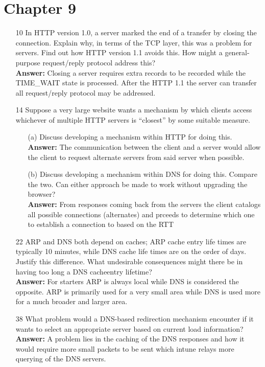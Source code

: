 \documentclass[a4paper]{article}
\begin{document}
\section*{Chapter 9}
\begin{itemize}
	\item[10] In HTTP version 1.0, a server marked the end of a transfer by closing the connection. Explain why, in terms of the TCP layer, this was a problem for servers. Find out how HTTP version 1.1 avoids this. How might a general-purpose request/reply protocol address this? \\
	      \textbf{Answer:} Closing a server requires extra records to be recorded while the TIME\_WAIT state is processed. After the HTTP 1.1 the server can transfer all request/reply protocol may be addressed.  
	\item[14] Suppose a very large website wants a mechanism by which clients access whichever of multiple HTTP servers is “closest” by some suitable measure.
	      \begin{itemize}
	      	\item[(a)] Discuss developing a mechanism within HTTP for doing this. \\
	      	      \textbf{Answer:} The communication between the client and a server would allow the client to request alternate servers from said server when possible.
	      	\item[(b)] Discuss developing a mechanism within DNS for doing this. Compare the two. Can either approach be made to work without upgrading the browser? \\
	      	      \textbf{Answer:} From responses coming back from the servers the client catalogs all possible connections (alternates) and prceeds to determine which one to establish a connection to based on the RTT
	      \end{itemize}
	\item[22] ARP and DNS both depend on caches; ARP cache entry life times are typically 10 minutes, while DNS cache life times are on the order of days. Justify this difference. What undesirable consequences might there be in having too long a DNS cacheentry lifetime? \\
	      \textbf{Answer:} For starters ARP is always local while DNS is considered the opposite. ARP is primarily used for a very small area while DNS is used more for a much broader and larger area. 
	\item[38] What problem would a DNS-based redirection mechanism encounter if it wants to select an appropriate server based on current load information? \\
	      \textbf{Answer:} A problem lies in the caching of the DNS responses and how it would require more small packets to be sent which intune relays more querying of the DNS servers.
\end{itemize}
\end{document}
